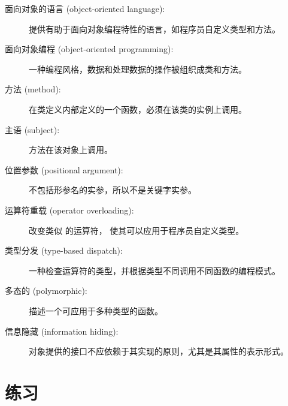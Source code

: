 \begin{description}

\item[面向对象的语言 (object-oriented language):] 提供有助于面向对象编程特性的语言，如程序员自定义类型和方法。

\item[面向对象编程 (object-oriented programming):] 一种编程风格，数据和处理数据的操作被组织成类和方法。

\item[方法 (method):] 在类定义内部定义的一个函数，必须在该类的实例上调用。

\item[主语 (subject):] 方法在该对象上调用。

\item[位置参数 (positional argument):]  不包括形参名的实参，所以不是关键字实参。
  

\item[运算符重载 (operator overloading):] 改变类似 \li{+} 的运算符，
使其可以应用于程序员自定义类型。
  

\item[类型分发 (type-based dispatch):] 一种检查运算符的类型，并根据类型不同调用不同函数的编程模式。

\item[多态的 (polymorphic):] 描述一个可应用于多种类型的函数。

\item[信息隐藏 (information hiding):] 对象提供的接口不应依赖于其实现的原则，尤其是其属性的表示形式。

\end{description}


\section{练习}


